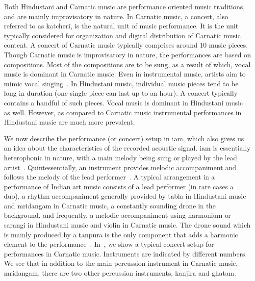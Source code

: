 Both Hindustani and Carnatic music are performance oriented music traditions, and are mainly improvisatory in nature. In Carnatic music, a concert, also referred to as \gls{katcheri}, is the natural unit of music performance. It is the unit typically considered for organization and digital distribution of Carnatic music content. A concert of Carnatic music typically comprises around 10 music pieces. Though Carnatic music is improvisatory in nature, the performances are based on compositions. Most of the compositions are to be sung, as a result of which, vocal music is dominant in Carnatic music. Even in instrumental music, artists aim to mimic vocal singing~\citep{Viswanathan2004}. In Hindustani music, individual music pieces tend to be long in duration (one single piece can last up to an hour). A concert typically contains a handful of such pieces. Vocal music is dominant in Hindustani music as well. However, as compared to Carnatic music instrumental performances in Hindustani music are much more prevalent. 

We now describe the performance (or concert) setup in \gls{iam}, which also gives us an idea about the characteristics of the recorded acoustic signal. \gls{iam} is essentially heterophonic in nature, with a main melody being sung or played by the lead artist~\citep{Bagchee1998}. Quintessentially, an instrument provides melodic accompaniment and follows the melody of the lead performer~\citep{Viswanathan2004}. A typical arrangement in a performance of Indian art music consists of a lead performer (in rare cases a duo), a rhythm accompaniment generally provided by \gls{tabla} in Hindustani music and \gls{mridangam} in Carnatic music, a constantly sounding drone in the background, and frequently, a melodic accompaniment using harmonium or \gls{sarangi} in Hindustani music and violin in Carnatic music. The drone sound which is mainly produced by a \gls{tanpura} is the only component that adds a harmonic element to the performance~\citep{Bagchee1998}. In~, we show a typical concert setup for performances in Carnatic music. Instruments are indicated by different numbers. We see that in addition to the main percussion instrument in Carnatic music, \gls{mridangam}, there are two other percussion instruments, \gls{kanjira} and \gls{ghatam}. 

